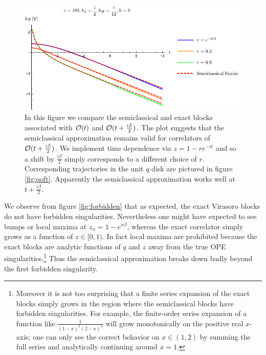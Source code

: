 \documentclass[12pt]{article}
\numberwithin{equation}{section}
\newcommand{\CO}{{\cal O}}
\begin{document}
\begin{figure}[t]
\hfill\includegraphics[]{BetaOver2SemiClassical}
\caption{In this figure we compare the semiclassical and exact blocks associated with $\CO(t)$ and $\CO(t + \frac{i \beta}{2})$.  The plot suggests that the semiclassical approximation remains valid for correlators of $\CO(t + \frac{i \beta}{2})$.  We implement time dependence via $z = 1 - r e^{-it}$ and so a shift by $\frac{i \beta}{2}$ simply corresponds to a different choice of $r$.  Corresponding trajectories in the unit $q$ disk are pictured in figure \ref{fig:qoft}.   Apparently the semiclassical approximation works well at $t + \frac{i \beta}{2}$.   }
\label{fig:betaover2}
\end{figure}


We observe from figure \ref{fig:forbidden} that as expected, the exact Virasoro blocks do not have forbidden singularities.  Nevertheless one might have expected to see bumps or local maxima at $z_n = 1 - e^{n \beta}$, whereas the exact correlator simply grows as a function of $z \in [0,1)$.  In fact local maxima are prohibited because the exact blocks are analytic functions of $q$ and $z$ away from the true OPE singularities.\footnote{Moreover it is not too surprising that a finite series expansion of the exact blocks simply grows in the region where the semiclassical blocks have forbidden singularities.  For example, the finite-order series expansion of a function like $\frac{1}{(1-x)^2(2-x)^2}$ will grow monotonically on the positive real $x$-axis; one can only see the correct behavior on $x \in (1,2)$ by summing the full series and analytically continuing around $x=1$.}  Thus the semiclassical approximation breaks down badly beyond the first forbidden singularity. 
\end{document}
